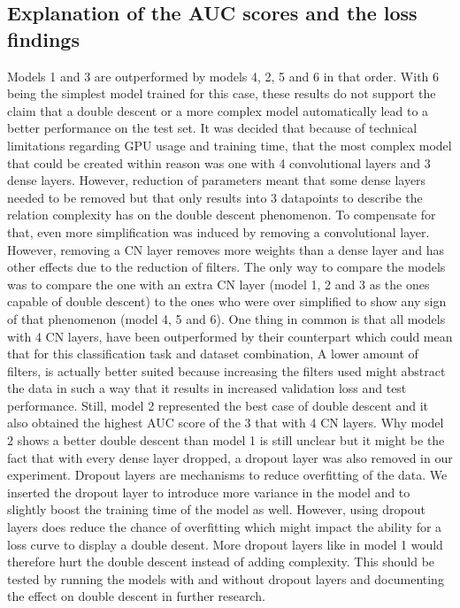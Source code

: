 \subsection{Explanation of the AUC scores and the loss findings}
Models 1 and 3 are outperformed by models 4, 2, 5 and 6 in that order. With 6 being the simplest model trained for this case, these results do not support the claim that a double descent or a more complex model automatically lead to a better performance on the test set. It was decided that because of technical limitations regarding GPU usage and training time, that the most complex model that could be created within reason was one with 4 convolutional layers and 3 dense layers. However, reduction of parameters meant that some dense layers needed to be removed but that only results into 3 datapoints to describe the relation complexity has on the double descent phenomenon. To compensate for that, even more simplification was induced by removing a convolutional layer. However, removing a CN layer removes more weights than a dense layer and has other effects due to the reduction of filters. The only way to compare the models was to compare the one with an extra CN layer (model 1, 2 and 3 as the ones capable of double descent) to the ones who were over simplified to show any sign of that phenomenon (model 4, 5 and 6). One thing in common is that all models with 4 CN layers, have been outperformed by their counterpart which could mean that for this classification task and dataset combination, A lower amount of filters, is actually better suited because increasing the filters used might abstract the data in such a way that it results in increased validation loss and test performance. Still, model 2 represented the best case of double descent and it also obtained the highest AUC score of the 3 that with 4 CN layers. Why model 2 shows a better double descent than model 1 is still unclear but it might be the fact that with every dense layer dropped, a dropout layer was also removed in our experiment. Dropout layers are mechanisms to reduce overfitting of the data. We inserted the dropout layer to introduce more variance in the model and to slightly boost the training time of the model as well. However, using dropout layers does reduce the chance of overfitting which might impact the ability for a loss curve to display a double desent. More dropout layers like in model 1 would therefore hurt the double descent instead of adding complexity. This should be tested by running the models with and without dropout layers and documenting the effect on double descent in further research.

